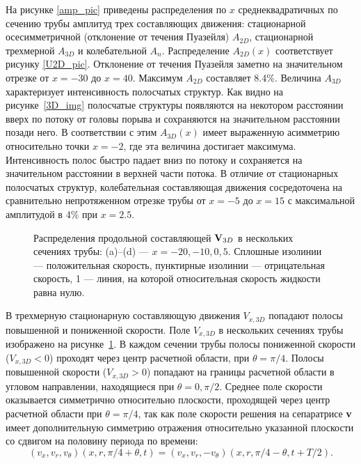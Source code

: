 На рисунке \ref{amp_pic} приведены распределения по $x$ среднеквадратичных по сечению трубы амплитуд трех составляющих движения: стационарной осесимметричной (отклонение от течения Пуазейля) $A_{2D}$, стационарной трехмерной $A_{3D}$ и колебательной $A_n$. Распределение $A_{2D}(x)$ соответствует рисунку \ref{U2D_pic}. Отклонение от течения Пуазейля заметно на значительном отрезке от $x=-30$ до $x=40$. Максимум $A_{2D}$ составляет 8.4\%. Величина $A_{3D}$ характеризует интенсивность полосчатых структур. Как видно на рисунке~\ref{3D_img} полосчатые структуры появляются на некотором расстоянии вверх по потоку от головы порыва и сохраняются на значительном расстоянии позади него. В соответствии с этим $A_{3D}(x)$ имеет выраженную асимметрию относительно точки $x=-2$, где эта величина достигает максимума. Интенсивность полос быстро падает вниз по потоку и сохраняется на значительном расстоянии в верхней части потока. В отличие от стационарных полосчатых структур, колебательная составляющая движения сосредоточена на сравнительно непротяженном отрезке трубы от $x=-5$ до $x=15$ с максимальной амплитудой в 4\% при $x=2.5$.


\begin{figure}[h]
\caption{Распределения продольной составляющей $\mathbf{V}_{3D}$ в нескольких сечениях трубы: (a)--(d) --- $x = -20, -10, 0, 5$. Сплошные изолинии --- положительная скорость, пунктирные изолинии --- отрицательная скорость, 1 --- линия, на которой относительная скорость жидкости равна нулю.}
\label{V3D_cs_pic}
\end{figure}


В трехмерную стационарную составляющую движения $V_{x,3D}$ попадают полосы повышенной и пониженной скорости. Поле $V_{x,3D}$ в нескольких сечениях трубы изображено на рисунке~\ref{V3D_cs_pic}. В каждом сечении трубы полосы пониженной скорости ($V_{x,3D} < 0$) проходят через центр расчетной области, при $\theta = \pi/4$. Полосы повышенной скорости ($V_{x,3D} > 0$) попадают на границы расчетной области в угловом направлении, находящиеся при $\theta = 0, \pi/2$. Среднее поле скорости оказывается симметрично относительно плоскости, проходящей через центр расчетной области при $\theta = \pi/4$, так как поле скорости решения на сепаратрисе $\mathbf{v}$ имеет дополнительную симметрию отражения относительно указанной плоскости со сдвигом на половину периода по времени:
\begin{equation}
(v_x, v_r, v_\theta)(x, r, \pi/4 + \theta, t) = (v_x, v_r, -v_\theta)(x, r, \pi/4 - \theta, t + T/2). 
\end{equation} 


